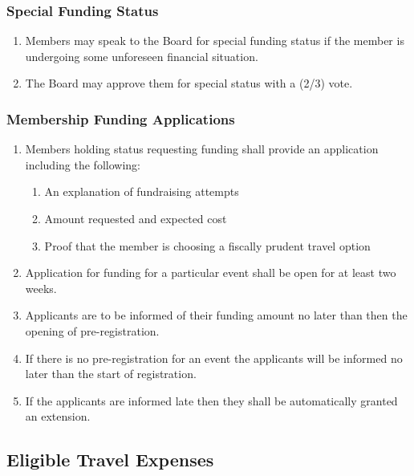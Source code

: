 \subsubsection{Special Funding Status}
\label{special-funding-status}

\begin{enumerate}
 \item
  Members may speak to the Board for special funding status if the member is undergoing some unforeseen financial situation.
 \item
  The Board may approve them for special status with a (2/3) vote.
\end{enumerate}

\subsubsection{Membership Funding Applications}
\label{membership-funding-applications}

\begin{enumerate}
 \item
  Members holding status requesting funding shall provide an application including the following:

  \begin{enumerate}
   \item
    An explanation of fundraising attempts
   \item
    Amount requested and expected cost
   \item
    Proof that the member is choosing a fiscally prudent travel option
  \end{enumerate}

 \item
  Application for funding for a particular event shall be open for at least two weeks.
 \item
  Applicants are to be informed of their funding amount no later than then the opening of pre-registration.
 \item
  If there is no pre-registration for an event the applicants will be informed no later than the start of registration.
 \item
  If the applicants are informed late then they shall be automatically granted an extension.
\end{enumerate}

\subsection{Eligible Travel Expenses}
\label{eligible-travel-expenses}

